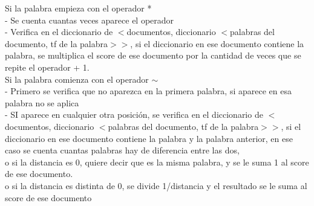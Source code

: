 \documentclass[12pt, a4paper]{article}
\begin{document}
\begin{enumerate}
\begin{itemize}
                        Si la palabra empieza con el operador *\\
                        - Se cuenta cuantas veces aparece el operador\\
                        - Verifica en el diccionario de
                        $<$documentos, diccionario $<$palabras del documento, tf de la palabra$>>$,
                        si el diccionario en ese documento contiene la palabra,
                        se multiplica el score de ese documento por la cantidad de veces que
                        se repite el operador + 1.\\


                        Si la palabra comienza con el operador $\sim$\\
                        - Primero se verifica que no aparezca en la primera palabra,
                        si aparece en esa palabra no se aplica\\
                        - SI aparece en cualquier otra posición,
                        se verifica en el diccionario de
                        $<$documentos, diccionario $<$palabras del documento, tf de la palabra$>>$,
                        si el diccionario en ese documento contiene la palabra y la palabra anterior,
                        en ese caso se cuenta cuantas palabras hay de diferencia entre las dos,\\
                        o si la distancia es 0, quiere decir que es la misma palabra, y se le suma 1 al score
                        de ese documento.\\
                        o si la distancia es distinta de 0, se divide 1/distancia y el resultado se le suma
                        al score de ese documento\\


            \end{itemize}


\end{enumerate}
\end{document}
